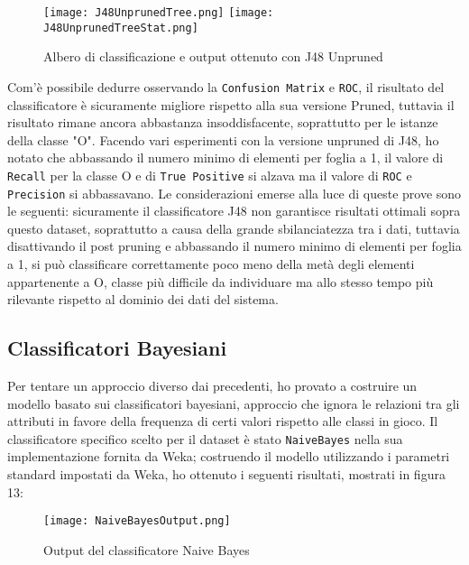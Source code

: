 \begin{figure}[H]
	\texttt{[image: J48UnprunedTree.png]}
	\texttt{[image: J48UnprunedTreeStat.png]}
	\caption{Albero di classificazione e output ottenuto con J48 Unpruned}
\end{figure}
Com'è possibile dedurre osservando la \texttt{Confusion Matrix} e \texttt{ROC}, il risultato del classificatore è sicuramente migliore rispetto alla sua versione Pruned, tuttavia il risultato rimane ancora abbastanza insoddisfacente, soprattutto per le istanze della classe "O".
Facendo vari esperimenti con la versione unpruned di J48, ho notato che abbassando il numero minimo di elementi per foglia a 1, il valore di \texttt{Recall} per la classe O e di \texttt{True Positive} si alzava ma il valore di \texttt{ROC} e \texttt{Precision} si abbassavano.
Le considerazioni emerse alla luce di queste prove sono le seguenti: sicuramente il classificatore J48 non garantisce risultati ottimali sopra questo dataset, soprattutto a causa della grande sbilanciatezza tra i dati, tuttavia disattivando il post pruning e abbassando il numero minimo di elementi per foglia a 1, si può classificare correttamente poco meno della metà degli elementi appartenente a O, classe più difficile da individuare ma allo stesso tempo più rilevante rispetto al dominio dei dati del sistema.
  
  \subsection{Classificatori Bayesiani}
  Per tentare un approccio diverso dai precedenti, ho provato a costruire un modello basato sui classificatori bayesiani, approccio che ignora le relazioni tra gli attributi in favore della frequenza di certi valori rispetto alle classi in gioco.
  Il classificatore specifico scelto per il dataset è stato \texttt{NaiveBayes} nella sua implementazione fornita da Weka; costruendo il modello utilizzando i parametri standard impostati da Weka, ho ottenuto i seguenti risultati, mostrati in figura 13:
  
  \begin{figure}[H]
  	\texttt{[image: NaiveBayesOutput.png]}
  	\caption{Output del classificatore Naive Bayes}
  \end{figure}

